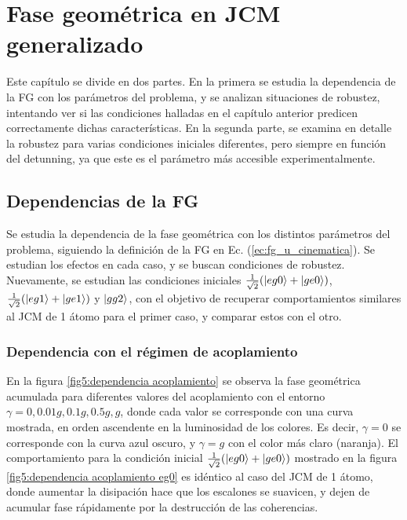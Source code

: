 \chapter{Fase geométrica en JCM generalizado}
\label{ch5:fgdoble}


\pagestyle{fancy}
\fancyhf{}
\fancyhead[LE]{\nouppercase{\rightmark\hfill}}
\fancyhead[RO]{\nouppercase{\leftmark\hfill}}
\fancyfoot[LE,RO]{\hfill\thepage\hfill}
Este capítulo se divide en dos partes. En la primera se estudia la dependencia de la FG con los parámetros del problema, y se analizan situaciones de robustez, intentando ver si las condiciones halladas en el capítulo anterior predicen correctamente dichas características. En la segunda parte, se examina en detalle la robustez para varias condiciones iniciales diferentes, pero siempre en función del detunning, ya que este es el parámetro más accesible experimentalmente.

\section{Dependencias de la FG}

Se estudia la dependencia de la fase geométrica con los distintos parámetros del problema, siguiendo la definición de la FG en Ec. (\ref{ec:fg_u_cinematica}). Se estudian los efectos en cada caso, y se buscan condiciones de robustez. Nuevamente, se estudian las condiciones iniciales $\frac{1}{\sqrt{2}}(\ket{eg0}+\ket{ge0})$, $\frac{1}{\sqrt{2}}(\ket{eg1}+\ket{ge1})$ y $\ket{gg2}$, con el objetivo de recuperar comportamientos similares al JCM de 1 átomo para el primer caso, y comparar estos con el otro. 

\subsection{Dependencia con el régimen de acoplamiento}

En la figura \ref{fig5:dependencia acoplamiento} se observa la fase geométrica acumulada para diferentes valores del acoplamiento con el entorno $\gamma=0, 0.01g,0.1g,0.5g,g$, donde cada valor se corresponde con una curva mostrada, en orden ascendente en la luminosidad de los colores. Es decir, $\gamma=0$ se corresponde con la curva azul oscuro, y $\gamma=g$ con el color más claro (naranja). El comportamiento para la condición inicial $\frac{1}{\sqrt{2}}(\ket{eg0}+\ket{ge0})$ mostrado en la figura \ref{fig5:dependencia acoplamiento eg0} es idéntico al caso del JCM de 1 átomo, donde aumentar la disipación hace que los escalones se suavicen, y dejen de acumular fase rápidamente por la destrucción de las coherencias. 

